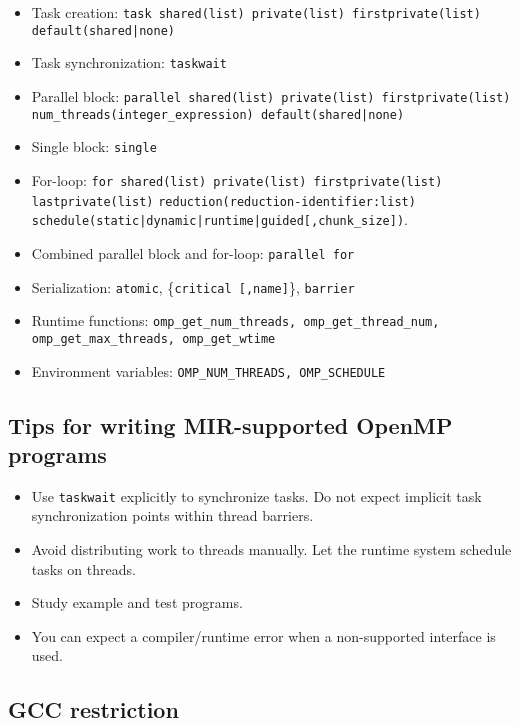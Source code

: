 \documentclass[11pt,a4paper]{article}
\begin{document}
\begin{itemize}
    \item Task creation: \texttt{task shared(list) private(list) firstprivate(list) default(shared|none)}
    \item Task synchronization: \texttt{taskwait}
    \item Parallel block: \texttt{parallel shared(list) private(list) firstprivate(list) num\_threads(integer\_expression) default(shared|none)}
    \item Single block: \texttt{single}
    \item For-loop: \texttt{for shared(list) private(list) firstprivate(list) lastprivate(list)} \texttt{reduction(reduction-identifier:list)} \\ \texttt{schedule(static|dynamic|runtime|guided[,chunk\_size])}.
    \item Combined parallel block and for-loop: \texttt{parallel for}
    \item Serialization: \texttt{atomic}, \{\texttt{critical [,name]}\}, \texttt{barrier}
    \item Runtime functions: \texttt{omp\_get\_num\_threads, omp\_get\_thread\_num, \\omp\_get\_max\_threads, omp\_get\_wtime}
    \item Environment variables: \texttt{OMP\_NUM\_THREADS, OMP\_SCHEDULE}
\end{itemize}

\subsection{Tips for writing MIR-supported OpenMP programs}\label{sec:tips-for-writing-mir-supported-openmp-programs}

\begin{itemize}
    \item Use \texttt{taskwait} explicitly to synchronize tasks. Do not expect implicit task synchronization points within thread barriers.
        \item Avoid distributing work to threads manually. Let the runtime system schedule tasks on threads.
        \item Study example and test programs.
        \item You can expect a compiler/runtime error when a non-supported interface is used.
\end{itemize}

\subsection{GCC restriction}
\label{sec:GCC-restriction}
\end{document}
